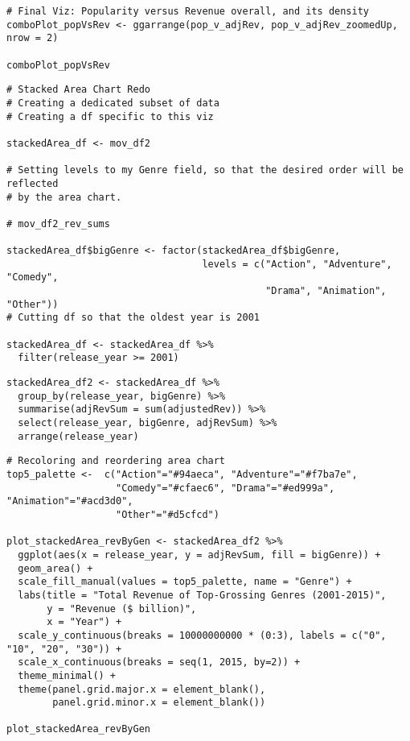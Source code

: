 \begin{lstlisting}
# Final Viz: Popularity versus Revenue overall, and its density
comboPlot_popVsRev <- ggarrange(pop_v_adjRev, pop_v_adjRev_zoomedUp, nrow = 2)

comboPlot_popVsRev
\end{lstlisting}

\begin{lstlisting}
# Stacked Area Chart Redo
# Creating a dedicated subset of data
# Creating a df specific to this viz

stackedArea_df <- mov_df2

# Setting levels to my Genre field, so that the desired order will be reflected
# by the area chart.

# mov_df2_rev_sums

stackedArea_df$bigGenre <- factor(stackedArea_df$bigGenre,
                                  levels = c("Action", "Adventure", "Comedy",
                                             "Drama", "Animation", "Other"))
# Cutting df so that the oldest year is 2001

stackedArea_df <- stackedArea_df %>%
  filter(release_year >= 2001)
\end{lstlisting}

\begin{lstlisting}
stackedArea_df2 <- stackedArea_df %>%
  group_by(release_year, bigGenre) %>%
  summarise(adjRevSum = sum(adjustedRev)) %>%
  select(release_year, bigGenre, adjRevSum) %>%
  arrange(release_year)
\end{lstlisting}

\begin{lstlisting}
# Recoloring and reordering area chart
top5_palette <-  c("Action"="#94aeca", "Adventure"="#f7ba7e",
                   "Comedy"="#cfaec6", "Drama"="#ed999a", "Animation"="#acd3d0",
                   "Other"="#d5cfcd")

plot_stackedArea_revByGen <- stackedArea_df2 %>%
  ggplot(aes(x = release_year, y = adjRevSum, fill = bigGenre)) +
  geom_area() +
  scale_fill_manual(values = top5_palette, name = "Genre") +
  labs(title = "Total Revenue of Top-Grossing Genres (2001-2015)",
       y = "Revenue ($ billion)",
       x = "Year") +
  scale_y_continuous(breaks = 10000000000 * (0:3), labels = c("0", "10", "20", "30")) +
  scale_x_continuous(breaks = seq(1, 2015, by=2)) +
  theme_minimal() +
  theme(panel.grid.major.x = element_blank(),
        panel.grid.minor.x = element_blank())

plot_stackedArea_revByGen
\end{lstlisting}

